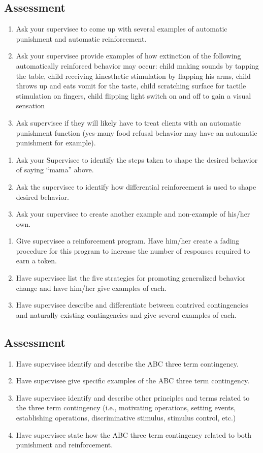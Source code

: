 \subsection{Assessment}
\begin{enumerate}
\item Ask your supervisee to come up with several examples of automatic punishment and automatic reinforcement. 
\item Ask your supervisee provide examples of how extinction of the following automatically reinforced behavior may occur: child making sounds by tapping the table, child receiving kinesthetic stimulation by flapping his arms, child throws up and eats vomit for the taste, child scratching surface for tactile stimulation on fingers, child flipping light switch on and off to gain a visual sensation
\item Ask supervisee if they will likely have to treat clients with an automatic punishment function (yes-many food refusal behavior may have an automatic punishment for example).
\end{enumerate}
%
\begin{enumerate}
\item Ask your Supervisee to identify the steps taken to shape the desired behavior of saying ``mama'' above. 
\item Ask the supervisee to identify how differential reinforcement is used to shape desired behavior.  
\item Ask your supervisee to create another example and non-example of his/her own. 
\end{enumerate}
%
\begin{enumerate}
\item Give supervisee a reinforcement program. Have him/her create a fading procedure for this program to increase the number of responses required to earn a token. 
\item Have supervisee list the five strategies for promoting generalized behavior change and have him/her give examples of each.
\item Have supervisee describe and differentiate between contrived contingencies and naturally existing contingencies and give several examples of each.
\end{enumerate}
\subsection{Assessment}
\begin{enumerate}
\item Have supervisee identify and describe the ABC three term contingency.
\item Have supervisee give specific examples of the ABC three term contingency.
\item Have supervisee identify and describe other principles and terms related to the three term contingency (i.e., motivating operations, setting events, establishing operations, discriminative stimulus, stimulus control, etc.)
\item Have supervisee state how the ABC three term contingency related to both punishment and reinforcement.
\end{enumerate}
%
